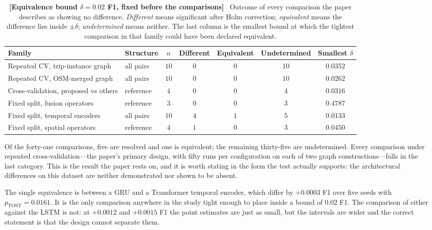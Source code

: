 \documentclass[journal]{IEEEtran}
\begin{document}
\begin{table}[!t]
  \centering
  \caption{\textbf{[Equivalence bound $\delta = 0.02$ F1, fixed before the
  comparisons]}~ Outcome of every comparison the paper describes as showing no
  difference. \emph{Different} means significant after Holm correction;
  \emph{equivalent} means the difference lies inside $\pm\delta$;
  \emph{undetermined} means neither. The last column is the smallest bound at
  which the tightest comparison in that family could have been declared
  equivalent.}
  \label{tab:equivalence}
  \renewcommand{\arraystretch}{1.2}
  \footnotesize
  \begin{tabular}{@{}llccccc@{}}
    \toprule
    \textbf{Family} & \textbf{Structure} & \textbf{$n$} & \textbf{Different}
    & \textbf{Equivalent} & \textbf{Undetermined}
    & \textbf{Smallest $\delta$} \\ \midrule
    Repeated CV, trip-instance graph & all pairs & $10$ & $0$ & $0$ & $10$ & $0.0352$ \\
    Repeated CV, OSM-merged graph & all pairs & $10$ & $0$ & $0$ & $10$ & $0.0262$ \\
    Cross-validation, proposed vs others & reference & $4$ & $0$ & $0$ & $4$ & $0.0316$ \\
    Fixed split, fusion operators & reference & $3$ & $0$ & $0$ & $3$ & $0.4787$ \\
    Fixed split, temporal encoders & all pairs & $10$ & $4$ & $1$ & $5$ & $0.0133$ \\
    Fixed split, spatial operators & reference & $4$ & $1$ & $0$ & $3$ & $0.0450$ \\
    \bottomrule
  \end{tabular}
\end{table}

Of the forty-one comparisons, five are resolved and one is equivalent; the
remaining thirty-five are undetermined. Every comparison under repeated
cross-validation---the paper's primary design, with fifty runs per
configuration on each of two graph constructions---falls in the last category.
This is the result the paper rests on, and it is worth stating in the form the
test actually supports: the architectural differences on this dataset are
neither demonstrated nor shown to be absent.

The single equivalence is between a GRU and a Transformer temporal encoder,
which differ by $+0.0003$ F1 over five seeds with $p_{\mathrm{TOST}} = 0.0161$.
It is the only comparison anywhere in the study tight enough to place inside a
bound of $0.02$ F1. The comparison of either against the LSTM is not: at
$+0.0012$ and $+0.0015$ F1 the point estimates are just as small, but the
intervals are wider and the correct statement is that the design cannot
separate them.
\end{document}
